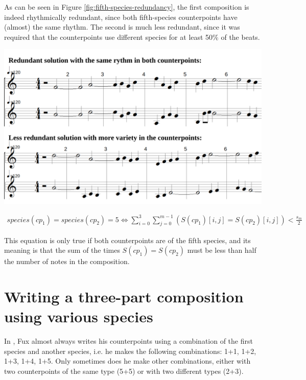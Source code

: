 \noindent
\begin{minipage}{0.37\textwidth}
    As can be seen in Figure \ref{fig:fifth-species-redundancy}, the first composition is indeed rhythmically redundant, since both fifth-species counterpoints have (almost) the same rhythm. The second is much less redundant, since it was required that the counterpoints use different species for at least 50\% of the beats.
    \end{minipage}
    \hfill
    \begin{minipage}{0.6\textwidth}
      \centering
      \includegraphics[width=\textwidth]{Images/fifth-species-redundancy.png}
      \label{fig:fifth-species-redundancy}
\end{minipage}
\vspace{.5cm}


\begin{equation}
\begin{aligned}
 \mathit{species(cp_1)} = \mathit{species}(cp_2) = 5 \iff \sum_{i=0}^{3} \sum_{j=0}^{m-1} (S(cp_1)[i,j] = S(cp_2)[i,j]) < \frac{s_m}{2}
\end{aligned}
\end{equation}

This equation is only true if both counterpoints are of the fifth species, and its meaning is that the sum of the times $S(cp_1)=S(cp_2)$ must be less than half the number of notes in the composition.

\section{Writing a three-part composition using various species}
In \gap, Fux almost always writes his counterpoints using a combination of the first species and another species, i.e. he makes the following combinations: 1+1, 1+2, 1+3, 1+4, 1+5. Only sometimes does he make other combinations, either with two counterpoints of the same type (5+5) or with two different types (2+3).

